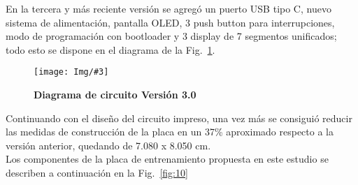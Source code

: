 \documentclass[times, 10pt,twocolumn]{article}
\newcommand{\Img}[5]{
   \begin{figure}[H]
   	   \centering
       \texttt{[image: Img/\#3]}
       \caption{ \centering \textbf{\small #4}}
       \label{#5}
       \end{figure}
   }
\begin{document}
En la tercera y más reciente versión se agregó un puerto USB tipo C, nuevo sistema de alimentación, pantalla OLED, 3 push button para interrupciones, modo de programación con bootloader y 3 display de 7 segmentos unificados; todo esto se dispone en el diagrama de la Fig.~\ref{fig:9}.
\Img{8.5cm}{7.0cm}{Tercera_Version}{Diagrama de circuito Versión 3.0}{fig:9}

Continuando con el diseño del circuito impreso, una vez más se consiguió reducir las medidas de construcción de la placa en un 37\% aproximado respecto a la versión anterior, quedando de 7.080 x 8.050 cm. \\ 
Los componentes de la placa de entrenamiento propuesta en este estudio se describen a continuación en la Fig.~\ref{fig:10}
\end{document}
